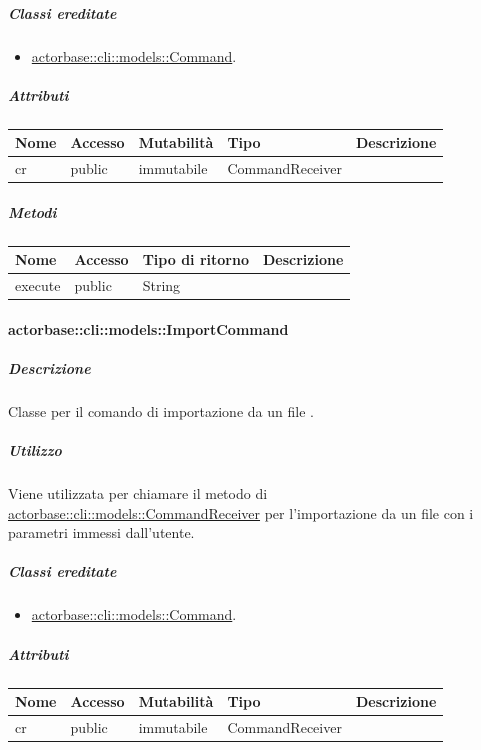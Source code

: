 \documentclass{scalatekids-article}
\begin{document}
\subparagraph{Classi ereditate}

\begin{itemize}
\item \hyperref[sec:actorbase::cli::models::Command]{actorbase::cli::models::Command}.
\end{itemize}

\subparagraph{Attributi}

\begin{tabular}{| l | l | l | l | l |}
	\hline
	Nome & Accesso & Mutabilità & Tipo & Descrizione\\
	\hline
	cr & public & immutabile & CommandReceiver & \\
	\hline
\end{tabular}

\subparagraph{Metodi}

\begin{tabular}{| l | l | l | l |}
	\hline
	Nome & Accesso & Tipo di ritorno & Descrizione\\
	\hline
	execute & public & String & \\
	\hline
\end{tabular}

\paragraph{actorbase::cli::models::ImportCommand}
\label{sec:actorbase::cli::models::ImportCommand}

\subparagraph{Descrizione}

Classe per il comando di importazione da un file .

\subparagraph{Utilizzo}

Viene utilizzata per chiamare il metodo di
\hyperref[sec:actorbase::cli::models::CommandReceiver]{actorbase::cli::models::CommandReceiver} per l'importazione da un file
 con i parametri immessi dall'utente.

\subparagraph{Classi ereditate}

\begin{itemize}
\item \hyperref[sec:actorbase::cli::models::Command]{actorbase::cli::models::Command}.
\end{itemize}

\subparagraph{Attributi}

\begin{tabular}{| l | l | l | l | l |}
	\hline
	Nome & Accesso & Mutabilità & Tipo & Descrizione\\
	\hline
	cr & public & immutabile & CommandReceiver & \\
	\hline
\end{tabular}
\end{document}
